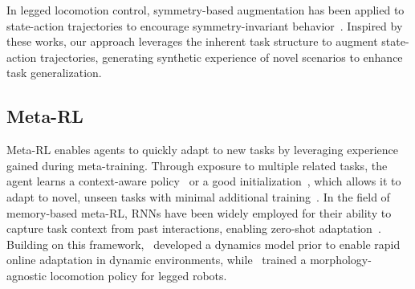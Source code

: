 In legged locomotion control, symmetry-based augmentation has been applied to state-action trajectories to encourage symmetry-invariant behavior~\citep{Mittal2024SymmetryCF, Su2024LeveragingSym}. 
Inspired by these works, our approach leverages the inherent task structure to augment state-action trajectories, generating synthetic experience of novel scenarios to enhance task generalization.

\subsection{Meta-RL}
Meta-RL enables agents to quickly adapt to new tasks by leveraging experience gained during meta-training. 
Through exposure to multiple related tasks, the agent learns a context-aware policy~\citep{duan2016RL2, wang2016learnToRL, mishra2017snail, melo2022transformersMetaRL} or a good initialization~\citep{finn2017MAML, li2017metaSGD, zintgraf2019CAVIA}, which allows it to adapt to novel, unseen tasks with minimal additional training~\citep{beck2023surveyMetaRL}. 
In the field of memory-based meta-RL, RNNs have been widely employed for their ability to capture task context from past interactions, enabling zero-shot adaptation~\citep{duan2016RL2, wang2016learnToRL}.
Building on this framework,~\citet{nagabandi2018adaptMetaRL} developed a dynamics model prior to enable rapid online adaptation in dynamic environments, while~\citet{zargarbashi2024metaloco} trained a morphology-agnostic locomotion policy for legged robots.